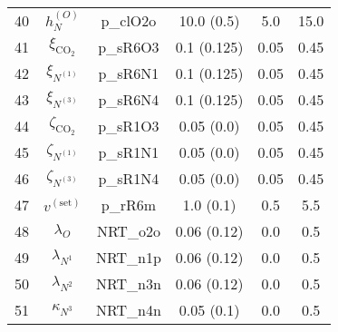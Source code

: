 \documentclass{article}
\begin{document}
\begin{table}
\begin{center}
\begin{small}
\begin{tabular}{ | c | c  c | c c c |}
40		& $h_N^{(O)}$  						& p\_clO2o	& 10.0 (0.5)	& 5.0			&15.0		\\
41		& $\xi_{\mathrm{CO}_2}$  			& p\_sR6O3 	& 0.1 (0.125) 		& 0.05		& 0.45		\\
42		& $\xi_{N^(1)}$  				& p\_sR6N1 	& 0.1 (0.125)		& 0.05		& 0.45		\\
43		& $\xi_{N^(3)}$  				& p\_sR6N4 	& 0.1 (0.125)		& 0.05		& 0.45		\\
44		& $\zeta_{\mathrm{CO}_2}$  		& p\_sR1O3 	& 0.05 (0.0)		& 0.05		& 0.45		\\
45		& $\zeta_{N^(1)}$  				& p\_sR1N1 	& 0.05 (0.0)		& 0.05		& 0.45 		\\
46		& $\zeta_{N^(3)}$  				& p\_sR1N4 	& 0.05 (0.0)		& 0.05		& 0.45		\\
47		& $v^{(\mathrm{set})}$  			& p\_rR6m 	& 1.0 (0.1)			& 0.5			& 5.5			\\
\hline
48		& $\lambda_O$  				& NRT\_o2o 	& 0.06 (0.12)		& 0.0			& 0.5			\\
49		& $\lambda_{N^{1}}$  			& NRT\_n1p 	& 0.06 (0.12)		& 0.0			& 0.5			\\
50		& $\lambda_{N^{2}}$  			& NRT\_n3n 	& 0.06 (0.12)		& 0.0			& 0.5			\\
51		& $\kappa_{N^{3}}$  				& NRT\_n4n  	& 0.05 (0.1)		& 0.0			& 0.5			\\
\hline
\end{tabular}
\end{small}
\end{center}
\end{table}
\end{document}
